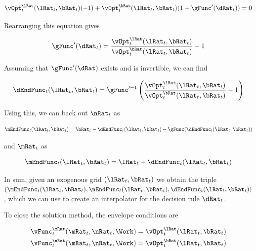 \documentclass{article}
\begin{document}
\begin{equation}
\vOpt_{t}^{\lRat}(\lRat_{t}, \bRat_{t})(-1) +
    \vOpt_{t}^{\bRat}(\lRat_{t}, \bRat_{t})(1+\gFunc'(\dRat_{t})) = 0
\end{equation}

Rearranging this equation gives

\begin{equation}
\gFunc'(\dRat_{t}) = \frac{\vOpt_{t}^{\lRat}(\lRat_{t},
        \bRat_{t})}{\vOpt_{t}^{\bRat}(\lRat_{t}, \bRat_{t})} - 1
\end{equation}

Assuming that $\gFunc'(\dRat)$ exists and is invertible, we can find

\begin{equation}
\dEndFunc_{t}(\lRat_{t}, \bRat_{t}) = \gFunc'^{-1}\left(
    \frac{\vOpt_{t}^{\lRat}(\lRat_{t},
        \bRat_{t})}{\vOpt_{t}^{\bRat}(\lRat_{t},
        \bRat_{t})} - 1 \right)
\end{equation}

Using this, we can back out $\nRat_{t}$ as

\begin{equation}
\nEndFunc_{t}(\lRat_{t}, \bRat_{t}) = \bRat_{t} -
    \dEndFunc_{t}(\lRat_{t}, \bRat_{t}) - \gFunc(\dEndFunc_{t}(\lRat_{t},
        \bRat_{t}))
\end{equation}

and $\mRat_{t}$ as

\begin{equation}
\mEndFunc_{t}(\lRat_{t}, \bRat_{t}) = \lRat_{t} +
    \dEndFunc_{t}(\lRat_{t}, \bRat_{t})
\end{equation}

In sum, given an exogenous grid $(\lRat_{t}, \bRat_{t})$ we obtain the triple
$\left(\mEndFunc_{t}(\lRat_{t}, \bRat_{t}), \nEndFunc_{t}(\lRat_{t},
\bRat_{t}), \dEndFunc_{t}(\lRat_{t}, \bRat_{t})\right)$, which we can use to create an interpolator for the decision rule $\dRat_{t}$.

To close the solution method, the envelope conditions are

\begin{equation}
\begin{split}
        \vFunc_{t}^{\mRat}(\mRat_{t}, \nRat_{t}, \Work) & =
        \vOpt_{t}^{\lRat}(\lRat_{t}, \bRat_{t}) \\
        \vFunc_{t}^{\nRat}(\mRat_{t}, \nRat_{t}, \Work) & =
        \vOpt_{t}^{\bRat}(\lRat_{t}, \bRat_{t})
    \end{split}
\end{equation}
\end{document}
